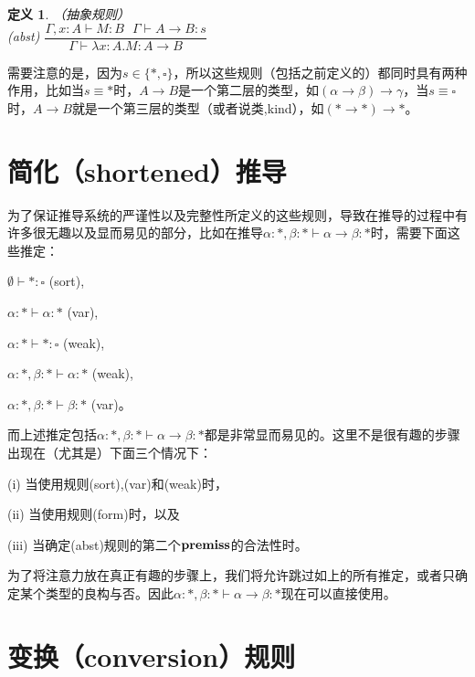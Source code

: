 \documentclass[UTF8]{article}
\newtheorem{thm}{定义}[section]
\begin{document}
		\begin{thm}（抽象规则）\\
			
			(abst) $\dfrac{\Gamma,x:A\vdash M:B\ \ \ \Gamma\vdash A\rightarrow B:s}{\Gamma\vdash\lambda x:A.M:A\rightarrow B}$
		\end{thm}
	
		需要注意的是，因为$s\in\{*,\square\}$，所以这些规则（包括之前定义的）都同时具有两种作用，比如当$s\equiv*$时，$A\rightarrow B$是一个第二层的类型，如$(\alpha\rightarrow\beta)\rightarrow\gamma$，当$s\equiv\square$时，$A\rightarrow B$就是一个第三层的类型（或者说类,kind），如$(*\rightarrow*)\rightarrow*$。
		
	\section{简化（shortened）推导}
		为了保证推导系统的严谨性以及完整性所定义的这些规则，导致在推导的过程中有许多很无趣以及显而易见的部分，比如在推导$\alpha:*,\beta:*\vdash\alpha\rightarrow\beta:*$时，需要下面这些推定：
	
		$\emptyset\vdash*:\square$ (sort),
		
		$\alpha:*\vdash\alpha:*$ (var),
		
		$\alpha:*\vdash*:\square$ (weak),
		
		$\alpha:*,\beta:*\vdash\alpha:*$ (weak),
		
		$\alpha:*,\beta:*\vdash\beta:*$ (var)。
		
		而上述推定包括$\alpha:*,\beta:*\vdash\alpha\rightarrow\beta:*$都是非常显而易见的。这里不是很有趣的步骤出现在（尤其是）下面三个情况下：
		
		(i) 当使用规则(sort),(var)和(weak)时，
		
		(ii) 当使用规则(form)时，以及
		
		(iii) 当确定(abst)规则的第二个$\bf premiss$的合法性时。
		
		为了将注意力放在真正有趣的步骤上，我们将允许跳过如上的所有推定，或者只确定某个类型的良构与否。因此$\alpha:*,\beta:*\vdash\alpha\rightarrow\beta:*$现在可以直接使用。
		
	\section{变换（conversion）规则}
\end{document}
